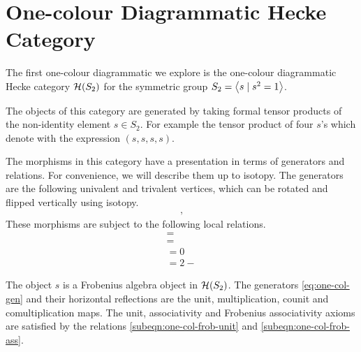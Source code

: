 \section{One-colour Diagrammatic Hecke Category}

The first one-colour diagrammatic we explore is the one-colour diagrammatic Hecke category $\mathcal{H}(S_2)$ for the symmetric group $S_2 = {\left\langle s \mathrel{|} s^2 = 1 \right\rangle}$. %

The objects of this category are generated by taking formal tensor products of the non-identity element $s \in S_2$. For example the tensor product of four $s$'s which denote with the expression $(s,s,s,s)$.

The morphisms in this category have a presentation in terms of generators and relations. For convenience, we will describe them up to isotopy. %
The generators are the following univalent and trivalent vertices, which can be rotated and flipped vertically using isotopy.
\begin{align} \label{eq:one-col-gen}
    
    \quad , \quad
    
\end{align}
These morphisms are subject to the following local relations.
\begin{subequations} \label{eq:one-col-sbim-rel}
    \begin{gather}
        \label{subeqn:one-col-frob-unit}
         = 
        \\
        \label{subeqn:one-col-frob-ass}
         = 
        \\
         = 0
        \\
         = 2  - 
    \end{gather}
\end{subequations}

\begin{remark}
    The object $s$ is a Frobenius algebra object in $\mathcal{H}(S_2)$. The generators \eqref{eq:one-col-gen} and their horizontal reflections are the unit, multiplication, counit and comultiplication maps. The unit, associativity and Frobenius associativity axioms are satisfied by the relations \eqref{subeqn:one-col-frob-unit} and \eqref{subeqn:one-col-frob-ass}.
\end{remark}

